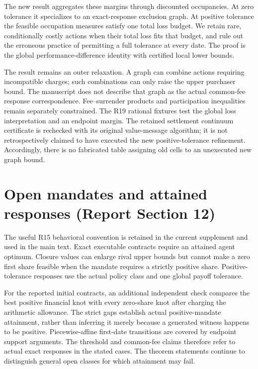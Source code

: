The new result aggregates these margins through discounted occupancies. At zero tolerance it specializes to an exact-response exclusion graph. At positive tolerance the feasible occupation measures satisfy one total loss budget. We retain rare, conditionally costly actions when their total loss fits that budget, and rule out the erroneous practice of permitting a full tolerance at every date. The proof is the global performance-difference identity with certified local lower bounds.

The result remains an outer relaxation. A graph can combine actions requiring incompatible charges; such combinations can only raise the upper purchaser bound. The manuscript does not describe that graph as the actual common-fee response correspondence. Fee--surrender products and participation inequalities remain separately constrained. The R19 rational fixtures test the global loss interpretation and an endpoint margin. The retained settlement continuum certificate is rechecked with its original value-message algorithm; it is not retrospectively claimed to have executed the new positive-tolerance refinement. Accordingly, there is no fabricated table assigning old cells to an unexecuted new graph bound.

\section{Open mandates and attained responses (Report Section 12)}
The useful R15 behavioral convention is retained in the current supplement and used in the main text. Exact executable contracts require an attained agent optimum. Closure values can enlarge rival upper bounds but cannot make a zero first share feasible when the mandate requires a strictly positive share. Positive-tolerance responses use the actual policy class and one global payoff tolerance.

For the reported initial contracts, an additional independent check compares the best positive financial knot with every zero-share knot after charging the arithmetic allowance. The strict gaps establish actual positive-mandate attainment, rather than inferring it merely because a generated witness happens to be positive. Piecewise-affine first-date transitions are covered by endpoint support arguments. The threshold and common-fee claims therefore refer to actual exact responses in the stated cases. The theorem statements continue to distinguish general open classes for which attainment may fail.

